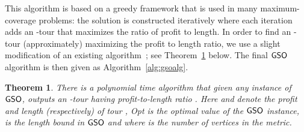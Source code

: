 \documentclass[11pt]{article}
\newtheorem{theorem}[thm]{Theorem}
\def\opt{{\sf Opt}\xspace}
\def\gso{\ensuremath{{\sf GSO}}\xspace}
\begin{document}
This algorithm is based on a 
greedy framework that is used in many maximum-coverage problems: the solution is constructed iteratively where each iteration adds an -tour that maximizes the ratio of profit to length. In order to find an -tour (approximately) maximizing the profit to length ratio, we use a slight modification of an existing algorithm~\cite{ccgg}; see Theorem~\ref{thm:gso-ratio} below.  The final \gso algorithm is then given as Algorithm~\ref{alg:gsoalg}.

\begin{theorem}  \label{thm:gso-ratio}
There is a polynomial time algorithm that given any instance of \gso, outputs an -tour  having profit-to-length ratio . Here   and  denote the profit and length (respectively) of tour , \opt is the optimal value of the \gso instance,  is the length bound in \gso and  where  is the number of vertices in the metric.
\end{theorem}
\end{document}
